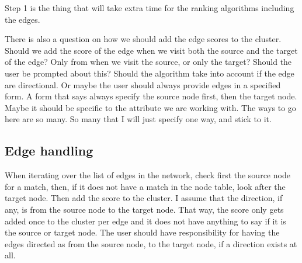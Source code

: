 Step 1 is the thing that will take extra time for the ranking algorithms
including the edges.

There is also a question on how we should add the edge scores to the cluster.
Should we add the score of the edge when we visit both the source and the target
of the edge? Only from when we visit the source, or only the target? Should the
user be prompted about this? Should the algorithm take into account if the edge
are directional. Or maybe the user should always provide edges in a specified
form. A form that says always specify the source node first, then the target
node. Maybe it should be specific to the attribute we are working with. The ways
to go here are so many. So many that I will just specify one way, and stick to
it. 

\subsection{Edge handling}
When iterating over the list of edges in the network, check first the source
node for a match, then, if it does not have a match in the node table, look
after the target node. Then add the score to the cluster. I assume that the
direction, if any, is from the source node to the target node. That way, the
score only gets added once to the cluster per edge and it does not have anything
to say if it is the source or target node. The user should have responsibility
for having the edges directed as from the source node, to the target node, if
a direction exists at all.


